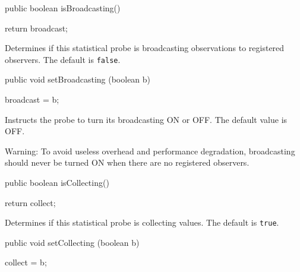 \begin{htmlonly}
\end{htmlonly}
\begin{code}

   public boolean isBroadcasting()\begin{hide} {
      return broadcast;
   }\end{hide}
\end{code}
\begin{tabb}   Determines if this statistical probe
 is broadcasting observations to registered observers.
 The default is \texttt{false}.
\end{tabb}
\begin{htmlonly}
\end{htmlonly}
\begin{code}

   public void setBroadcasting (boolean b)\begin{hide} {
      broadcast = b;
   }\end{hide}
\end{code}
\begin{tabb}  Instructs the probe to turn its broadcasting ON or OFF.
  The default value is OFF. 

  Warning: To avoid useless overhead and performance degradation, broadcasting
  should never be turned ON when there are no registered observers.
\end{tabb}
\begin{htmlonly}
\end{htmlonly}
\begin{code}

   public boolean isCollecting()\begin{hide} {
      return collect;
   }\end{hide}
\end{code}
\begin{tabb}   Determines if this statistical probe
 is collecting values. The default is \texttt{true}.
\end{tabb}
\begin{htmlonly}
\end{htmlonly}
\begin{code}

   public void setCollecting (boolean b)\begin{hide} {
      collect = b;
   }\end{hide}
\end{code}
